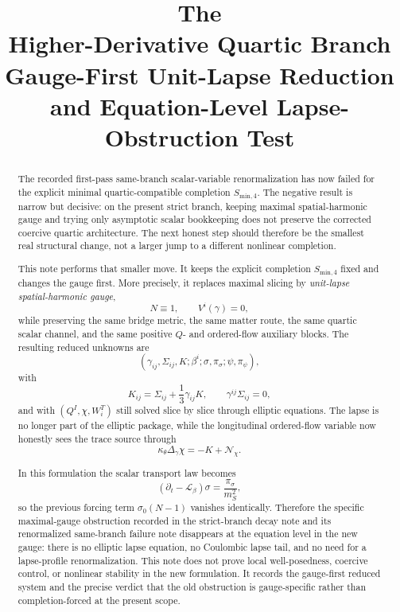 \documentclass[11pt]{article}
\title{\textbf{The \TheoryName{}}\\[0.4em]
\large Higher-Derivative Quartic Branch Gauge-First Unit-Lapse Reduction and Equation-Level Lapse-Obstruction Test}
\author{}
\date{}
\newcommand{\Ell}{\mathcal{L}}
\begin{document}
\maketitle

\begin{abstract}
The recorded first-pass same-branch scalar-variable renormalization has now failed for the explicit minimal quartic-compatible completion \(S_{\mathrm{min},4}\). The negative result is narrow but decisive: on the present strict branch, keeping maximal spatial-harmonic gauge and trying only asymptotic scalar bookkeeping does not preserve the corrected coercive quartic architecture. The next honest step should therefore be the smallest real structural change, not a larger jump to a different nonlinear completion.

This note performs that smaller move. It keeps the explicit completion \(S_{\mathrm{min},4}\) fixed and changes the gauge first. More precisely, it replaces maximal slicing by \emph{unit-lapse spatial-harmonic gauge},
\[
N\equiv 1,
\qquad
V^i(\gamma)=0,
\]
while preserving the same bridge metric, the same matter route, the same quartic scalar channel, and the same positive \(Q\)- and ordered-flow auxiliary blocks. The resulting reduced unknowns are
\[
(\gamma_{ij},\Sigma_{ij},K;\beta^i;\sigma,\pi_\sigma;\psi,\pi_\psi),
\]
with
\[
K_{ij}=\Sigma_{ij}+\frac{1}{3}\gamma_{ij}K,
\qquad
\gamma^{ij}\Sigma_{ij}=0,
\]
and with \((Q^I,\chi,W_i^T)\) still solved slice by slice through elliptic equations. The lapse is no longer part of the elliptic package, while the longitudinal ordered-flow variable now honestly sees the trace source through
\[
\kappa_\theta \Delta_\gamma \chi
=
-K+\mathcal N_\chi.
\]

In this formulation the scalar transport law becomes
\[
(\partial_t-\Ell_\beta)\sigma
=
\frac{\pi_\sigma}{m_S^2},
\]
so the previous forcing term \(\sigma_0(N-1)\) vanishes identically. Therefore the specific maximal-gauge obstruction recorded in the strict-branch decay note and its renormalized same-branch failure note disappears at the equation level in the new gauge: there is no elliptic lapse equation, no Coulombic lapse tail, and no need for a lapse-profile renormalization. This note does not prove local well-posedness, coercive control, or nonlinear stability in the new formulation. It records the gauge-first reduced system and the precise verdict that the old obstruction is gauge-specific rather than completion-forced at the present scope.
\end{abstract}
\end{document}
